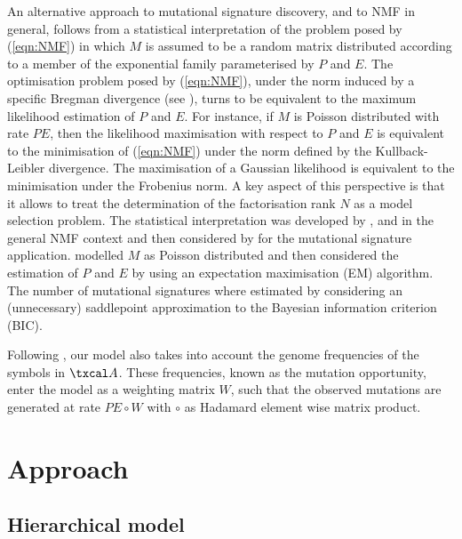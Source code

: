 \documentclass{bioinfo}
\begin{document}
An alternative approach to mutational signature discovery, and to NMF
in general, follows from a statistical interpretation of the problem
posed by (\ref{eqn:NMF}) in which $M$ is assumed to be a random matrix
distributed according to a member of the exponential family
parameterised by $P$ and $E$. The optimisation problem posed by
(\ref{eqn:NMF}), under the norm induced by a specific Bregman
divergence (see \citealp{BMD}), turns to be equivalent to the maximum
likelihood estimation of $P$ and $E$.  For instance, if $M$ is Poisson
distributed with rate $PE$, then the likelihood maximisation with
respect to $P$ and $E$ is equivalent to the minimisation of
(\ref{eqn:NMF}) under the norm defined by the Kullback-Leibler
divergence. The maximisation of a Gaussian likelihood is equivalent to
the minimisation under the Frobenius norm. A key aspect of this
perspective is that it allows to treat the determination of the
factorisation rank $N$ as a model selection problem. The statistical
interpretation was developed by \cite{C}, \cite{FC} and \cite{SWK} in
the general NMF context and then considered by \cite{FICMV} for the
mutational signature application. \cite{FICMV} modelled $M$ as Poisson
distributed and then considered the estimation of $P$ and $E$ by using
an expectation maximisation (EM) algorithm. The number of mutational
signatures where estimated by considering an (unnecessary) saddlepoint
approximation to the Bayesian information criterion
(BIC). 


Following \cite{FICMV}, our model also takes into account the genome
frequencies of the symbols in $\txcal A$.  These frequencies, known as
the mutation opportunity, enter the model as a weighting matrix $W$, 
such  that the observed mutations are generated at rate $PE\circ W$
with $\circ$ as  Hadamard element wise matrix product.


\section{Approach}
\subsection{Hierarchical model}
\end{document}
